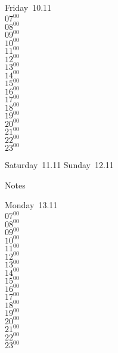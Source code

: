 \documentclass[11pt, a4paper]{book}\usepackage[]{graphicx}\usepackage[]{color}
\begin{document}
\begin{weekdaybox}
  Friday~10.11\\
  { 
  \vfill
  $07^{00}$\\
$08^{00}$\\
$09^{00}$\\
$10^{00}$\\
$11^{00}$\\
$12^{00}$\\
$13^{00}$\\
$14^{00}$\\
$15^{00}$\\
$16^{00}$\\
$17^{00}$\\
$18^{00}$\\
$19^{00}$\\
$20^{00}$\\
$21^{00}$\\
$22^{00}$\\
$23^{00}$\\
  }
\end{weekdaybox}
\begin{weekendbox}
  Saturday~11.11
  \tcblower
  Sunday~12.11
\end{weekendbox} %
\begin{notebox}
  Notes
\end{notebox}
\clearpage
\begin{headerbox}
\end{headerbox}
\begin{weekdaybox}
  Monday~13.11\\
  { 
  \vfill
  $07^{00}$\\
$08^{00}$\\
$09^{00}$\\
$10^{00}$\\
$11^{00}$\\
$12^{00}$\\
$13^{00}$\\
$14^{00}$\\
$15^{00}$\\
$16^{00}$\\
$17^{00}$\\
$18^{00}$\\
$19^{00}$\\
$20^{00}$\\
$21^{00}$\\
$22^{00}$\\
$23^{00}$\\
  }
\end{weekdaybox}
\end{document}
